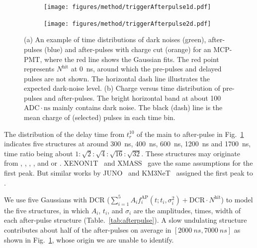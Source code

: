 \begin{figure}[!htbp]
    \centering
    \begin{subfigure}[t]{\LF\textwidth}
        \texttt{[image: figures/method/triggerAfterpulse1d.pdf]}
        \caption{}%
        \label{fig:afterpulse1d}
    \end{subfigure}
    \begin{subfigure}[t]{\LF\textwidth}
        \texttt{[image: figures/method/triggerAfterpulse2d.pdf]}
        \caption{}
        \label{fig:afterpulse2d}
    \end{subfigure}
    \caption{(a) An example of time distributions of dark noises (green), after-pulses (blue) and after-pulses with charge cut (orange) for an MCP-PMT, where the red line shows the Gaussian fits. The red point represents $N^{\mathrm{hit}}$ at \SI{0}{ns}, around which the pre-pulses and delayed pulses are not shown. The horizontal dash line illustrates the expected dark-noise level. (b) Charge versus time distribution of pre-pulses and after-pulses. The bright horizontal band at about 100\,$\mathrm{ADC}\cdot \mathrm{ns}$ mainly contains dark noise. The black (dash) line is the mean charge of (selected) pulses in each time bin.}
\end{figure}

The distribution of the delay time from $t_r^{10}$ of the main to after-pulse in Fig.~\ref{fig:afterpulse1d} indicates five structures at around \SI{300}{ns}, \SI{400}{ns}, \SI{600}{ns}, \SI{1200}{ns} and \SI{1700}{ns}, time ratio being about $1:\sqrt{2}:\sqrt{4}:\sqrt{16}:\sqrt{32}$. These structures may originate from , , , , and  or . XENON1T~\cite{XENON1TTesting} and XMASS~\cite{Abe_2020} gave the same assumptions for the first peak. But similar works by JUNO~\cite{Zhao:2022gks} and KM3NeT~\cite{KM3NetTesting} assigned the first peak to .

We use five Gaussians with DCR ($\sum_{i=1}^{5}{A_if_i^{\mathrm{AP}}(t;t_i,\sigma_i^2)} + \mathrm{DCR}\cdot N^{\mathrm{hit}}$) to model the five structures, in which $A_i$, $t_i$, and $\sigma_i$ are the amplitudes, times, width of each after-pulse structure (Table.~\ref{tab:afterpulse}). %
A slow undulating structure contributes about half of the after-pulses on average in $[\SI{2000}{ns},\SI{7000}{ns}]$ as shown in Fig.~\ref{fig:afterpulse1d}, whose origin we are unable to identify.

